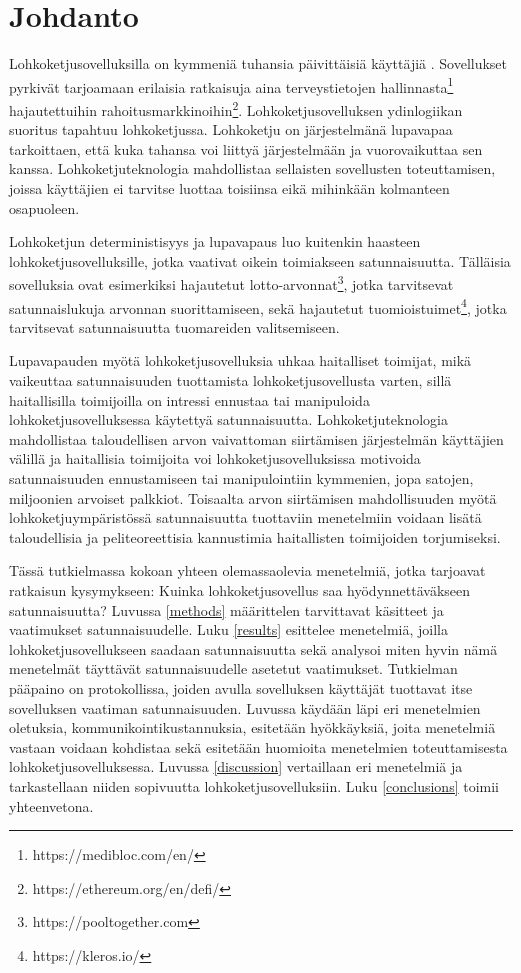 \chapter{Johdanto\label{intro}}

Lohkoketjusovelluksilla on kymmeniä tuhansia päivittäisiä käyttäjiä \cite{noauthor_state_nodate}. Sovellukset pyrkivät tarjoamaan erilaisia ratkaisuja aina terveystietojen hallinnasta\footnote{https://medibloc.com/en/} hajautettuihin rahoitusmarkkinoihin\footnote{https://ethereum.org/en/defi/}. Lohkoketjusovelluksen ydinlogiikan suoritus tapahtuu lohkoketjussa. Lohkoketju on järjestelmänä lupavapaa tarkoittaen, että kuka tahansa voi liittyä järjestelmään ja vuorovaikuttaa sen kanssa. Lohkoketjuteknologia mahdollistaa sellaisten sovellusten toteuttamisen, joissa käyttäjien ei tarvitse luottaa toisiinsa eikä mihinkään kolmanteen osapuoleen.

Lohkoketjun deterministisyys ja lupavapaus luo kuitenkin haasteen lohkoketjusovelluksille, jotka vaativat oikein toimiakseen satunnaisuutta. Tälläisia sovelluksia ovat esimerkiksi hajautetut lotto-arvonnat\footnote{https://pooltogether.com}, jotka tarvitsevat satunnaislukuja arvonnan suorittamiseen, sekä hajautetut tuomioistuimet\footnote{https://kleros.io/}, jotka tarvitsevat satunnaisuutta tuomareiden valitsemiseen. 

Lupavapauden myötä lohkoketjusovelluksia uhkaa haitalliset toimijat, mikä vaikeuttaa satunnaisuuden tuottamista lohkoketjusovellusta varten, sillä haitallisilla toimijoilla on intressi ennustaa tai manipuloida lohkoketjusovelluksessa käytettyä satunnaisuutta. Lohkoketjuteknologia mahdollistaa taloudellisen arvon vaivattoman siirtämisen järjestelmän käyttäjien välillä ja haitallisia toimijoita voi lohkoketjusovelluksissa motivoida satunnaisuuden ennustamiseen tai manipulointiin kymmenien, jopa satojen, miljoonien arvoiset palkkiot. Toisaalta arvon siirtämisen mahdollisuuden myötä lohkoketjuympäristössä satunnaisuutta tuottaviin menetelmiin voidaan lisätä taloudellisia ja peliteoreettisia kannustimia haitallisten toimijoiden torjumiseksi.

Tässä tutkielmassa kokoan yhteen olemassaolevia menetelmiä, jotka tarjoavat ratkaisun kysymykseen: Kuinka lohkoketjusovellus saa hyödynnettäväkseen satunnaisuutta? Luvussa \ref{methods} määrittelen tarvittavat käsitteet ja vaatimukset satunnaisuudelle. Luku \ref{results} esittelee menetelmiä, joilla lohkoketjusovellukseen saadaan satunnaisuutta sekä analysoi miten hyvin nämä menetelmät täyttävät satunnaisuudelle asetetut vaatimukset. Tutkielman pääpaino on protokollissa, joiden avulla sovelluksen käyttäjät tuottavat itse sovelluksen vaatiman satunnaisuuden. Luvussa käydään läpi eri menetelmien oletuksia, kommunikointikustannuksia, esitetään hyökkäyksiä, joita menetelmiä vastaan voidaan kohdistaa sekä esitetään huomioita menetelmien toteuttamisesta lohkoketjusovelluksessa. Luvussa \ref{discussion} vertaillaan eri menetelmiä ja tarkastellaan niiden sopivuutta lohkoketjusovelluksiin. Luku \ref{conclusions} toimii yhteenvetona.

